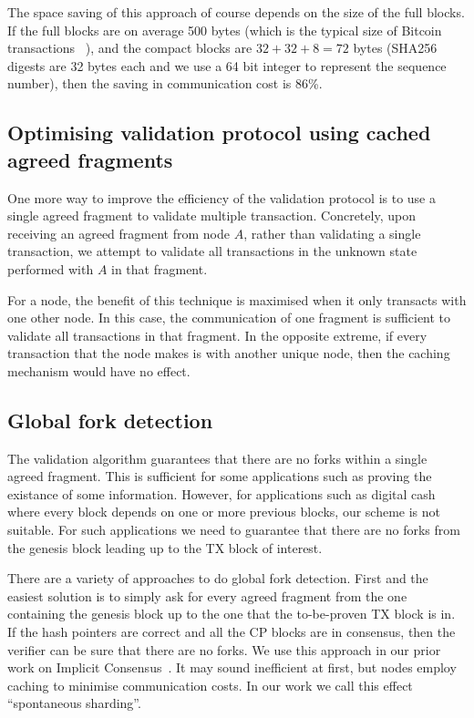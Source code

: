 The space saving of this approach of course depends on the size of the full blocks.
If the full blocks are on average 500 bytes
(which is the typical size of Bitcoin transactions ~\cite{txsize}),
and the compact blocks are $32 + 32 + 8 = 72$ bytes
(SHA256 digests are 32 bytes each and we use a 64 bit integer to represent the sequence number),
then the saving in communication cost is 86\%.


\subsection{Optimising validation protocol using cached agreed fragments}
\label{sec:caching}
One more way to improve the efficiency of the validation protocol is to use a single agreed fragment to validate multiple transaction.
Concretely, upon receiving an agreed fragment from node $A$,
rather than validating a single transaction,
we attempt to validate all transactions in the unknown state performed with $A$ in that fragment.

For a node, the benefit of this technique is maximised when it only transacts with one other node.
In this case, the communication of one fragment is sufficient to validate all transactions in that fragment.
In the opposite extreme, if every transaction that the node makes is with another unique node,
then the caching mechanism would have no effect.

\subsection{Global fork detection}
The validation algorithm guarantees that there are no forks within a single agreed fragment.
This is sufficient for some applications such as proving the existance of some information.
However, for applications such as digital cash where every block depends on one or more previous blocks,
our scheme is not suitable.
For such applications we need to guarantee that there are no forks from the genesis block leading up to the TX block of interest.

There are a variety of approaches to do global fork detection.
First and the easiest solution is to simply ask for every agreed fragment from the one containing the genesis block up to the one that the to-be-proven TX block is in.
If the hash pointers are correct and all the CP blocks are in consensus, then the verifier can be sure that there are no forks.
We use this approach in our prior work on Implicit Consensus~\cite{implicitconsensus}.
It may sound inefficient at first, but nodes employ caching to minimise communication costs.
In our work we call this effect ``spontaneous sharding''.

